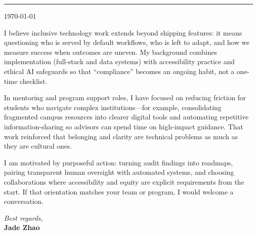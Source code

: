 \documentclass[11pt]{article}
\begin{document}


\vspace{0.5em}
\noindent\rule{\linewidth}{1pt}
\vspace{0.75em}

\noindent\today

\vspace{0.75em}

I believe inclusive technology work extends beyond shipping features: it means questioning who is served by default workflows, who is left to adapt, and how we measure success when outcomes are uneven. My background combines implementation (full-stack and data systems) with accessibility practice and ethical AI safeguards so that ``compliance'' becomes an ongoing habit, not a one-time checklist.

In mentoring and program support roles, I have focused on reducing friction for students who navigate complex institutions---for example, consolidating fragmented campus resources into clearer digital tools and automating repetitive information-sharing so advisors can spend time on high-impact guidance. That work reinforced that belonging and clarity are technical problems as much as they are cultural ones.

I am motivated by purposeful action: turning audit findings into roadmaps, pairing transparent human oversight with automated systems, and choosing collaborations where accessibility and equity are explicit requirements from the start. If that orientation matches your team or program, I would welcome a conversation.

\vspace{1.5em}
\noindent\textit{Best regards,}\\
\textbf{Jade Zhao}
\end{document}
